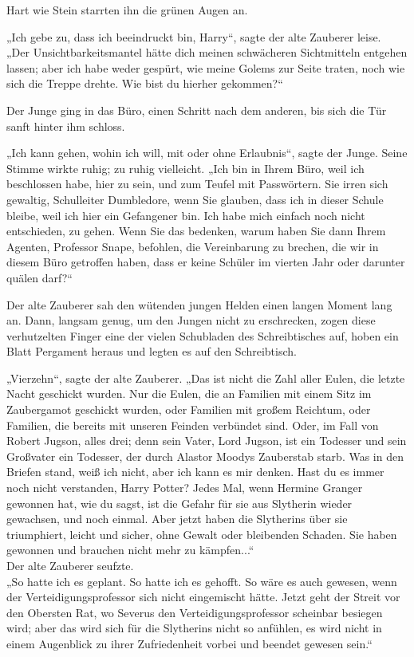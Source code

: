 {Hart wie Stein starrten ihn die grünen Augen an.

„Ich gebe zu, dass ich beeindruckt bin, Harry“, sagte der alte Zauberer leise.\\ „Der Unsichtbarkeitsmantel hätte dich meinen schwächeren Sichtmitteln entgehen lassen; aber ich habe weder gespürt, wie meine Golems zur Seite traten, noch wie sich die Treppe drehte. Wie bist du hierher gekommen?“

Der Junge ging in das Büro, einen Schritt nach dem anderen, bis sich die Tür sanft hinter ihm schloss.

„Ich kann gehen, wohin ich will, mit oder ohne Erlaubnis“, sagte der Junge. Seine Stimme wirkte ruhig; zu ruhig vielleicht. „Ich bin in Ihrem Büro, weil ich beschlossen habe, hier zu sein, und zum Teufel mit Passwörtern. Sie irren sich gewaltig, Schulleiter Dumbledore, wenn Sie glauben, dass ich in dieser Schule bleibe, weil ich hier ein Gefangener bin. Ich habe mich einfach noch nicht entschieden, zu gehen. Wenn Sie das bedenken, warum haben Sie dann Ihrem Agenten, Professor Snape, befohlen, die Vereinbarung zu brechen, die wir in diesem Büro getroffen haben, dass er keine Schüler im vierten Jahr oder darunter quälen darf?“

Der alte Zauberer sah den wütenden jungen Helden einen langen Moment lang an. Dann, langsam genug, um den Jungen nicht zu erschrecken, zogen diese verhutzelten Finger eine der vielen Schubladen des Schreibtisches auf, hoben ein Blatt Pergament heraus und legten es auf den Schreibtisch.

„Vierzehn“, sagte der alte Zauberer. „Das ist nicht die Zahl aller Eulen, die letzte Nacht geschickt wurden. Nur die Eulen, die an Familien mit einem Sitz im Zaubergamot geschickt wurden, oder Familien mit großem Reichtum, oder Familien, die bereits mit unseren Feinden verbündet sind. Oder, im Fall von Robert Jugson, alles drei; denn sein Vater, Lord Jugson, ist ein Todesser und sein Großvater ein Todesser, der durch Alastor Moodys Zauberstab starb. Was in den Briefen stand, weiß ich nicht, aber ich kann es mir denken. Hast du es immer noch nicht verstanden, Harry Potter? Jedes Mal, wenn Hermine Granger gewonnen hat, wie du sagst, ist die Gefahr für sie aus Slytherin wieder gewachsen, und noch einmal. Aber jetzt haben die Slytherins über sie triumphiert, leicht und sicher, ohne Gewalt oder bleibenden Schaden. Sie haben gewonnen und brauchen nicht mehr zu kämpfen...“\\ Der alte Zauberer seufzte.\\ „So hatte ich es geplant. So hatte ich es gehofft. So wäre es auch gewesen, wenn der Verteidigungsprofessor sich nicht eingemischt hätte. Jetzt geht der Streit vor den Obersten Rat, wo Severus den Verteidigungsprofessor scheinbar besiegen wird; aber das wird sich für die Slytherins nicht so anfühlen, es wird nicht in einem Augenblick zu ihrer Zufriedenheit vorbei und beendet gewesen sein.“

}
